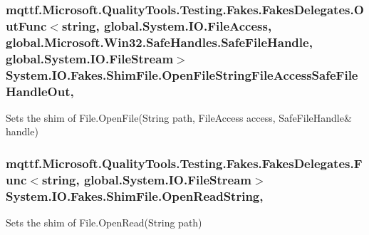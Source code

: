 \hypertarget{class_system_1_1_i_o_1_1_fakes_1_1_shim_file_aa5828e46b5a2fc5593c4e9beae63ff7b}{
\subsubsection[{Open\-File\-String\-File\-Access\-Safe\-File\-Handle\-Out}]{\setlength{\rightskip}{0pt plus 5cm}mqttf.\-Microsoft.\-Quality\-Tools.\-Testing.\-Fakes.\-Fakes\-Delegates.\-Out\-Func$<$string, global.\-System.\-I\-O.\-File\-Access, global.\-Microsoft.\-Win32.\-Safe\-Handles.\-Safe\-File\-Handle, global.\-System.\-I\-O.\-File\-Stream$>$ System.\-I\-O.\-Fakes.\-Shim\-File.\-Open\-File\-String\-File\-Access\-Safe\-File\-Handle\-Out\hspace{0.3cm}{\ttfamily [static]}, {\ttfamily [set]}}}\label{class_system_1_1_i_o_1_1_fakes_1_1_shim_file_aa5828e46b5a2fc5593c4e9beae63ff7b}


Sets the shim of File.\-Open\-File(String path, File\-Access access, Safe\-File\-Handle\& handle)

\hypertarget{class_system_1_1_i_o_1_1_fakes_1_1_shim_file_a7e3c5f11098199239c27b9d4f090e043}{
\subsubsection[{Open\-Read\-String}]{\setlength{\rightskip}{0pt plus 5cm}mqttf.\-Microsoft.\-Quality\-Tools.\-Testing.\-Fakes.\-Fakes\-Delegates.\-Func$<$string, global.\-System.\-I\-O.\-File\-Stream$>$ System.\-I\-O.\-Fakes.\-Shim\-File.\-Open\-Read\-String\hspace{0.3cm}{\ttfamily [static]}, {\ttfamily [set]}}}\label{class_system_1_1_i_o_1_1_fakes_1_1_shim_file_a7e3c5f11098199239c27b9d4f090e043}


Sets the shim of File.\-Open\-Read(\-String path)

